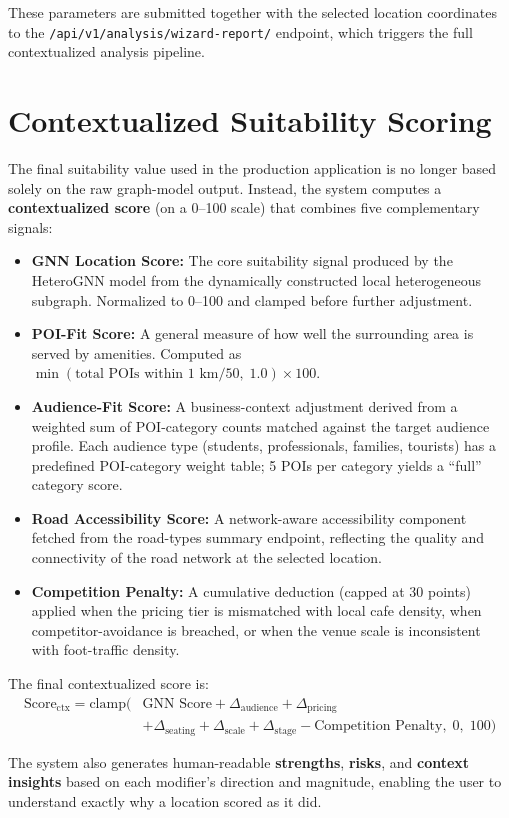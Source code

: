 These parameters are submitted together with the selected location coordinates to the \texttt{/api/v1/analysis/wizard-report/} endpoint, which triggers the full contextualized analysis pipeline.

\section{Contextualized Suitability Scoring}
The final suitability value used in the production application is no longer based solely on the raw graph-model output. Instead, the system computes a \textbf{contextualized score} (on a 0--100 scale) that combines five complementary signals:
\begin{itemize}
    \item \textbf{GNN Location Score:} The core suitability signal produced by the HeteroGNN model from the dynamically constructed local heterogeneous subgraph. Normalized to 0--100 and clamped before further adjustment.
    \item \textbf{POI-Fit Score:} A general measure of how well the surrounding area is served by amenities. Computed as $\min(\text{total POIs within 1 km} / 50,\; 1.0) \times 100$.
    \item \textbf{Audience-Fit Score:} A business-context adjustment derived from a weighted sum of POI-category counts matched against the target audience profile. Each audience type (students, professionals, families, tourists) has a predefined POI-category weight table; 5 POIs per category yields a ``full'' category score.
    \item \textbf{Road Accessibility Score:} A network-aware accessibility component fetched from the road-types summary endpoint, reflecting the quality and connectivity of the road network at the selected location.
    \item \textbf{Competition Penalty:} A cumulative deduction (capped at 30 points) applied when the pricing tier is mismatched with local cafe density, when competitor-avoidance is breached, or when the venue scale is inconsistent with foot-traffic density.
\end{itemize}

The final contextualized score is:
\begin{align}
\text{Score}_{\text{ctx}} = \text{clamp}\bigl(&\text{GNN Score} + \Delta_{\text{audience}} + \Delta_{\text{pricing}} \nonumber\\
&+ \Delta_{\text{seating}} + \Delta_{\text{scale}} + \Delta_{\text{stage}} - \text{Competition Penalty},\; 0,\; 100\bigr)
\end{align}

The system also generates human-readable \textbf{strengths}, \textbf{risks}, and \textbf{context insights} based on each modifier's direction and magnitude, enabling the user to understand exactly why a location scored as it did.
